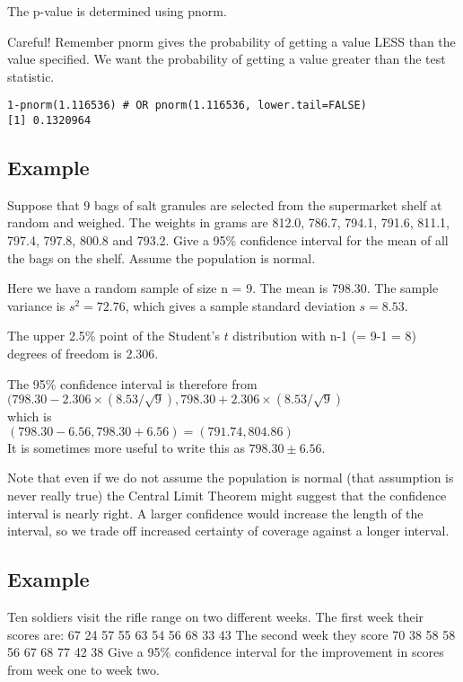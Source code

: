 \documentclass[12pt, a4paper]{report}
\theoremstyle{plain}
\theoremstyle{definition}
\theoremstyle{remark}
\begin{document}
The p-value is determined using pnorm.

Careful! Remember pnorm
gives the probability of getting a value LESS than the value specified. We want the probability of getting a value greater than
the test statistic.
\begin{verbatim}
1-pnorm(1.116536) # OR pnorm(1.116536, lower.tail=FALSE)
[1] 0.1320964
\end{verbatim}
\newpage




\subsection{Example}
Suppose that 9 bags of salt granules are selected from the supermarket
shelf at random and weighed. The weights in grams are 812.0, 786.7, 794.1,
791.6, 811.1, 797.4, 797.8, 800.8 and 793.2. Give a 95\% confidence interval for the
mean of all the bags on the shelf. Assume the population is normal.


Here we have a random sample of size n = 9. The mean is 798.30. The sample
variance is $s^2 = 72.76$, which gives a sample standard deviation $s = 8.53$.

The upper 2.5\% point of the Student's $t$ distribution with n-1 (= 9-1 = 8) degrees of freedom is 2.306.

The 95\% confidence interval is therefore from \\
$(798.30 - 2.306 \times (8.53/\sqrt{9}), 798.30 + 2.306 \times (8.53/\sqrt{9})$\\
which is\\
$(798.30 - 6.56, 798.30 + 6.56) = (791.74, 804.86)$\\
It is sometimes more useful to write this as $798.30 \pm 6.56$.

Note that even if we do not assume the population is normal (that assumption is
never really true) the Central Limit Theorem might suggest that the confidence interval
is nearly right. A larger confidence would increase the length of the interval, so we
trade off increased certainty of coverage against a longer interval.

\subsection{Example}
Ten soldiers visit the rifle range on two different weeks. The first
week their scores are:
67 24 57 55 63 54 56 68 33 43
The second week they score
70 38 58 58 56 67 68 77 42 38
Give a 95\% confidence interval for the improvement in scores from week one to
week two.
\end{document}
